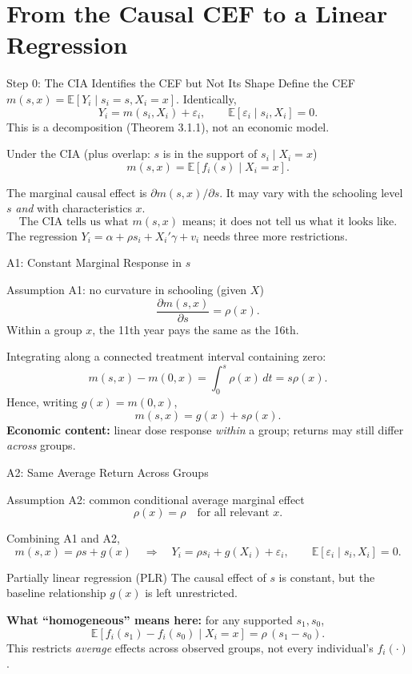 \documentclass[aspectratio=169,11pt]{beamer}
\newcommand{\E}{\mathbb{E}}
\begin{document}
\section{From the Causal CEF to a Linear Regression}
\begin{frame}{Step 0: The CIA Identifies the CEF but Not Its Shape}
\small
Define the CEF $m(s,x)=\E[Y_i\mid s_i=s,X_i=x]$. Identically,
\[
Y_i=m(s_i,X_i)+\varepsilon_i,\qquad \E[\varepsilon_i\mid s_i,X_i]=0.
\]
This is a decomposition (Theorem 3.1.1), not an economic model.
\begin{block}{Under the CIA (plus overlap: $s$ is in the support of $s_i\mid X_i=x$)}
\[
\boxed{m(s,x)=\E[f_i(s)\mid X_i=x].}
\]
\end{block}
The marginal causal effect is $\partial m(s,x)/\partial s$. It may vary with the schooling level $s$ \emph{and} with characteristics $x$.
\medskip
\[
\boxed{\text{The CIA tells us what }m(s,x)\text{ means; it does not tell us what it looks like.}}
\]
The regression $Y_i=\alpha+\rho s_i+X_i'\gamma+v_i$ needs three more restrictions.
\end{frame}

\begin{frame}{A1: Constant Marginal Response in $s$}
\small
\begin{block}{Assumption A1: no curvature in schooling (given $X$)}
\[
\boxed{\frac{\partial m(s,x)}{\partial s}=\rho(x).}
\]
Within a group $x$, the 11th year pays the same as the 16th.
\end{block}
Integrating along a connected treatment interval containing zero:
\[
m(s,x)-m(0,x)=\int_0^s\rho(x)\,dt=s\rho(x).
\]
Hence, writing $g(x)=m(0,x)$,
\[
\boxed{m(s,x)=g(x)+s\rho(x).}
\]
\textbf{Economic content:} linear dose response \emph{within} a group; returns may still differ \emph{across} groups.
\end{frame}

\begin{frame}{A2: Same Average Return Across Groups}
\small
\begin{block}{Assumption A2: common conditional average marginal effect}
\[
\boxed{\rho(x)=\rho\quad\text{for all relevant }x.}
\]
\end{block}
Combining A1 and A2,
\[
\boxed{m(s,x)=\rho s+g(x)}
\quad\Longrightarrow\quad
Y_i=\rho s_i+g(X_i)+\varepsilon_i,\qquad \E[\varepsilon_i\mid s_i,X_i]=0.
\]
\begin{block}{Partially linear regression (PLR)}
The causal effect of $s$ is constant, but the baseline relationship $g(x)$ is left unrestricted.
\end{block}
\medskip
\textbf{What ``homogeneous'' means here:} for any supported $s_1,s_0$,
\[
\E[f_i(s_1)-f_i(s_0)\mid X_i=x]=\rho\,(s_1-s_0).
\]
This restricts \emph{average} effects across observed groups, not every individual's $f_i(\cdot)$.
\end{frame}
\end{document}
